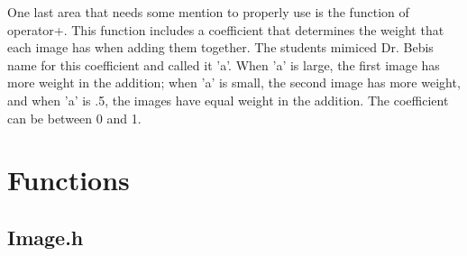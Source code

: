 \documentclass[pdftex, 11pt]{article}
\begin{document}
One last area that needs some mention to properly use is the function of operator+. This function includes a coefficient
that determines the weight that each image has when adding them together. The students mimiced Dr. Bebis name for this
coefficient and called it 'a'. When 'a' is large, the first image has more weight in the addition; when 'a' is small,
the second image has more weight, and when 'a' is .5, the images have equal weight in the addition. The coefficient can
be between 0 and 1.

\section{Functions}

\subsection{Image.h}
\end{document}
